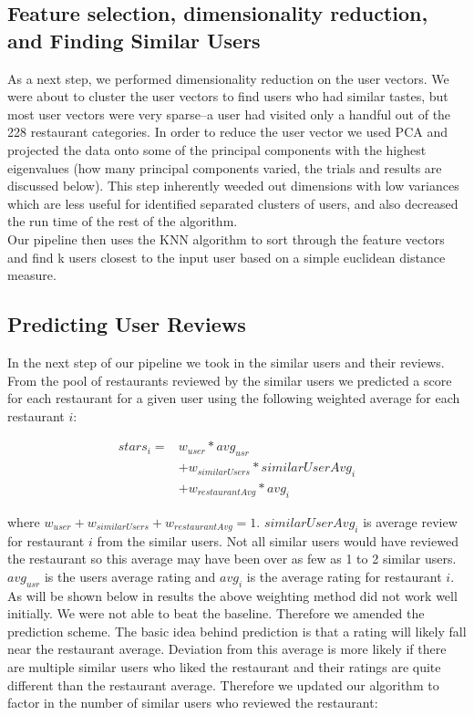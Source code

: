 \documentclass[10pt,twocolumn,letterpaper]{article}
\newcommand{\wu}{\ensuremath{w_{user}}}
\newcommand{\ws}{\ensuremath{w_{similarUsers}}}
\newcommand{\wrst}{\ensuremath{w_{restaurantAvg}}}
\begin{document}
\subsection{Feature selection, dimensionality reduction, and Finding Similar Users}
As a next step, we performed dimensionality reduction on the user vectors. We were about to cluster the user vectors to find users who had similar tastes, but most user vectors were very sparse--a user had visited only a handful out of the 228 restaurant categories. In order to reduce the user vector we used PCA and projected the data onto some of the principal components with the highest eigenvalues (how many principal components varied, the trials and results are discussed below). This step inherently weeded out dimensions with low variances which are less useful for identified separated clusters of users, and also decreased the run time of the rest of the algorithm.\\
\indent Our pipeline then uses the KNN algorithm to sort through the feature vectors and find k users closest to the input user based on a simple euclidean distance measure. 

\subsection{Predicting User Reviews}
In the next step of our pipeline we took in the similar users and their reviews. From the pool of restaurants reviewed by the similar users we predicted a score for each restaurant for a given user using the following weighted average for each restaurant $i$:

\begin{align*}
stars_{i} = & \wu * avg_{usr}\\
&+ \ws * similarUserAvg_{i}\\
&+ \wrst * avg_{i}
\end{align*}

 where $\wu + \ws + \wrst = 1$. $similarUserAvg_i$ is average review for restaurant $i$ from the similar users. Not all similar users would have reviewed the restaurant so this average may have been over as few as 1 to 2 similar users. $avg_{usr}$ is the users average rating and $avg_{i}$ is the average rating for restaurant $i$.
\\[0.5em]
\indent As will be shown below in results the above weighting method did not work well initially. We were not able to beat the baseline. Therefore we amended the prediction scheme. The basic idea behind prediction is that a rating will likely fall near the restaurant average. Deviation from this average is more likely if there are multiple similar users who liked the restaurant and their ratings are quite different than the restaurant average. Therefore we updated our algorithm to factor in the number of similar users who reviewed the restaurant:
\end{document}

